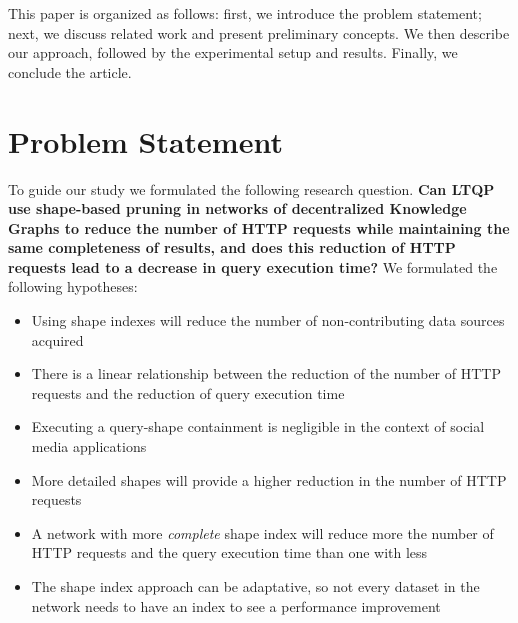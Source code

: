 This paper is organized as follows: first, we introduce the problem statement; next, we discuss related work and present preliminary concepts.
We then describe our approach, followed by the experimental setup and results.
Finally, we conclude the article.

\section{Problem Statement}
To guide our study we formulated the following research question.
\textbf{Can LTQP use shape-based pruning in networks of decentralized Knowledge Graphs to reduce the number of HTTP requests while maintaining the same completeness of results, and does this reduction of HTTP requests lead to a decrease in query execution time?}
We formulated the following hypotheses:
\setcounter{hypothesisCounter}{1}

\begin{itemize}[label=\textbf{H}\,]
    \item Using shape indexes will reduce the number of non-contributing data sources acquired
    \item There is a linear relationship between the reduction of the number of HTTP requests and the reduction of query execution time
    \item Executing a query-shape containment is negligible in the context of social media applications
    \item More detailed shapes will provide a higher reduction in the number of HTTP requests
    \item A network with more \emph{complete} shape index will reduce more the number of HTTP requests and the query execution time than one with less
    \item The shape index approach can be adaptative, so not every dataset in the network needs to have an index to see a performance improvement
\end{itemize}
